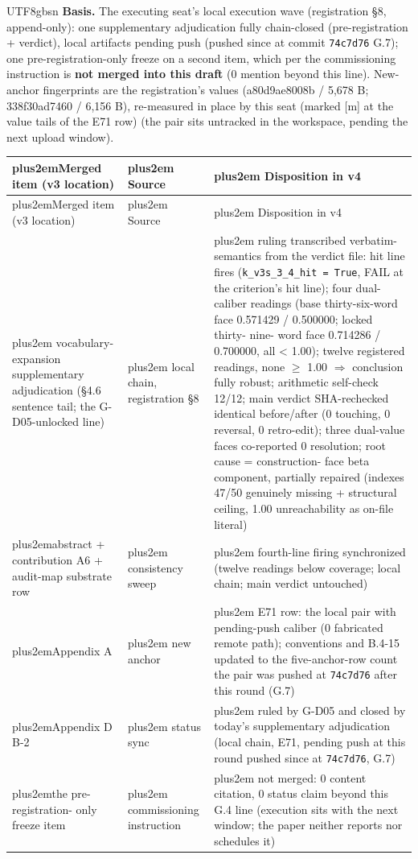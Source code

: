 \documentclass[11pt,letterpaper]{article}
\newcommand{\RaggedRight}{\rightskip=0pt plus2em\relax}
\begin{document}
\begin{CJK}{UTF8}{gbsn}
\textbf{Basis.} The executing seat's local execution wave (registration \S{}8, append-only): one supplementary adjudication fully chain-closed (pre-registration + verdict), local artifacts pending push (pushed since at commit \texttt{74c7d76} \textemdash{} G.7); one pre-registration-only freeze on a second item, which per the commissioning instruction is \textbf{not merged into this draft} (0 mention beyond this line). New-anchor fingerprints are the registration's values (a80d9ae8008b / 5,678 B; 338f30ad7460 / 6,156 B), re-measured in place by this seat (marked [m] at the value tails of the E71 row) (the pair sits untracked in the workspace, pending the next upload window).

{\small\begin{longtable}{>{\RaggedRight\arraybackslash}p{4.57cm} >{\RaggedRight\arraybackslash}p{4.57cm} >{\RaggedRight\arraybackslash}p{4.57cm}}
\toprule
Merged item (v3 location) & Source & Disposition in v4 \\
\midrule
\endfirsthead
\toprule
Merged item (v3 location) & Source & Disposition in v4 \\
\midrule
\endhead
\endfoot
\bottomrule
\endlastfoot
vocabulary-\penalty-100 expansion supplementary adjudication (\S{}4.6 sentence tail; the G-D05-unlocked line) & local chain, registration \S{}8 & ruling transcribed verbatim-\penalty-100 semantics from the verdict file: hit line fires (\texttt{k\_v3s\_3\_4\_hit = True}, FAIL at the criterion's hit line); four dual-caliber readings (base thirty-six-word face 0.571429 / 0.500000; locked thirty-\penalty-100 nine-\penalty-100 word face 0.714286 / 0.700000, all < 1.00); twelve registered readings, none \ensuremath{\geq} 1.00 \ensuremath{\Rightarrow} conclusion fully robust; arithmetic self-check 12/12; main verdict SHA-rechecked identical before/after (0 touching, 0 reversal, 0 retro-edit); three dual-value faces co-reported 0 resolution; root cause = construction-\penalty-100 face beta component, partially repaired (indexes 47/50 genuinely missing + structural ceiling, 1.00 unreachability as on-file literal) \\
abstract + contribution A6 + audit-map substrate row & consistency sweep & fourth-line firing synchronized (twelve readings below coverage; local chain; main verdict untouched) \\
Appendix A & new anchor & E71 row: the local pair with pending-push caliber (0 fabricated remote path); conventions and B.4-15 updated to the five-anchor-row count \textemdash{} the pair was pushed at \texttt{74c7d76} after this round (G.7) \\
Appendix D B-2 & status sync & ruled by G-D05 and closed by today's supplementary adjudication (local chain, E71, pending push at this round \textemdash{} pushed since at \texttt{74c7d76}, G.7) \\
the pre-\penalty-100 registration-\penalty-100 only freeze item & commissioning instruction & not merged: 0 content citation, 0 status claim beyond this G.4 line (execution sits with the next window; the paper neither reports nor schedules it) \\
\end{longtable}}


\end{CJK}
\end{document}
